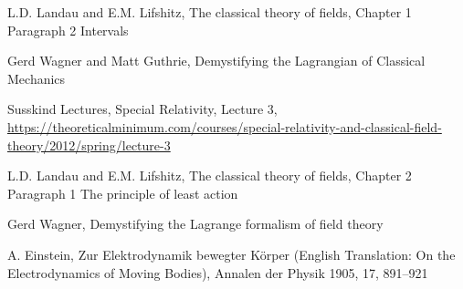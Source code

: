 \documentclass{article}
\begin{document}
\begin{thebibliography}{9}

 L.D. Landau and E.M. Lifshitz, The classical theory of fields, Chapter 1 Paragraph 2 Intervals

 Gerd Wagner and Matt Guthrie, Demystifying the Lagrangian of Classical Mechanics

 Susskind Lectures, Special Relativity, Lecture 3, \url{https://theoreticalminimum.com/courses/special-relativity-and-classical-field-theory/2012/spring/lecture-3}

 L.D. Landau and E.M. Lifshitz, The classical theory of fields, Chapter 2 Paragraph 1 The principle of least action

 Gerd Wagner, Demystifying the Lagrange formalism of field theory

 A. Einstein, Zur Elektrodynamik bewegter K\"{o}rper (English Translation: On the Electrodynamics of Moving Bodies), Annalen der Physik 1905, 17, 891--921

\end{thebibliography}
\end{document}
